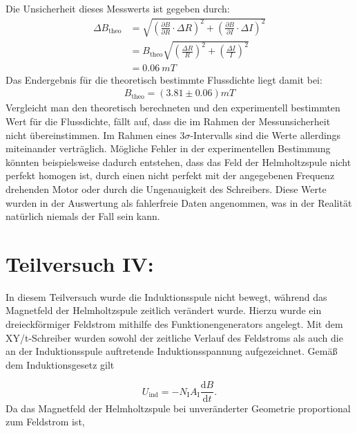 \documentclass{report}
\begin{document}
Die Unsicherheit dieses Messwerts ist gegeben durch:
\begin{equation}
    \begin{split}
        \Delta B_{\mathrm{theo}} &= \sqrt{\left(\frac{\partial B}{\partial R}\cdot \Delta R\right)^2 + \left(\frac{\partial B}{\partial I} \cdot \Delta I\right)^2} \\
                                 &= B_{\mathrm{theo}} \sqrt{\left(\frac{\Delta R}{R}\right)^2 + \left(\frac{\Delta I}{I}\right)^2} \\
                                 &= \qty{0.06}{mT}
    \end{split}
\end{equation}
Das Endergebnis für die theoretisch bestimmte Flussdichte liegt damit bei:
\begin{equation}
    \begin{split}
        \boxed{B_{\mathrm{theo}} = (3.81 \pm 0.06) \si{mT}}
    \end{split}
\end{equation}
Vergleicht man den theoretisch berechneten und den experimentell bestimmten Wert für die Flussdichte, fällt auf, dass die im Rahmen der Messunsicherheit nicht 
übereinstimmen. Im Rahmen eines $3\sigma$-Intervalls sind die Werte allerdings miteinander verträglich. Mögliche Fehler in der experimentellen Bestimmung könnten
beispielsweise dadurch entstehen, dass das Feld der Helmholtzspule nicht perfekt homogen ist, durch einen nicht perfekt mit der angegebenen Frequenz drehenden Motor 
oder durch die Ungenauigkeit des Schreibers. Diese Werte wurden in der Auswertung als fahlerfreie Daten angenommen, was in der Realität natürlich niemals der Fall
sein kann.
\newpage
\section{Teilversuch IV: }
\noindent
In diesem Teilversuch wurde die Induktionsspule nicht bewegt, während das Magnetfeld
der Helmholtzspule zeitlich verändert wurde. Hierzu wurde ein dreieckförmiger
Feldstrom mithilfe des Funktionengenerators angelegt. Mit dem XY/t-Schreiber wurden sowohl der zeitliche Verlauf des
Feldstroms als auch die an der Induktionsspule auftretende Induktionsspannung
aufgezeichnet.
\noindent
Gemäß dem Induktionsgesetz gilt

\begin{equation}
U_{\mathrm{ind}}
=
-N_{\mathrm I}A_{\mathrm I}
\frac{\mathrm dB}{\mathrm dt}.
\end{equation}
\noindent
Da das Magnetfeld der Helmholtzspule bei unveränderter Geometrie proportional zum
Feldstrom ist,
\end{document}
